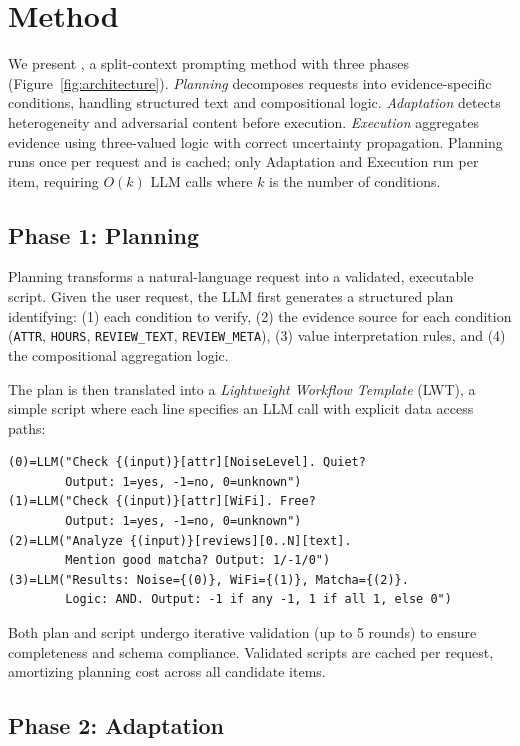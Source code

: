 \section{Method}



We present \method, a split-context prompting method with three phases (Figure~\ref{fig:architecture}).
\emph{Planning} decomposes requests into evidence-specific conditions, handling structured text and compositional logic.
\emph{Adaptation} detects heterogeneity and adversarial content before execution.
\emph{Execution} aggregates evidence using three-valued logic with correct uncertainty propagation.
Planning runs once per request and is cached; only Adaptation and Execution run per item, requiring $O(k)$ LLM calls where $k$ is the number of conditions.

\subsection{Phase 1: Planning}

Planning transforms a natural-language request into a validated, executable script.
Given the user request, the LLM first generates a structured plan identifying: (1) each condition to verify, (2) the evidence source for each condition (\texttt{ATTR}, \texttt{HOURS}, \texttt{REVIEW\_TEXT}, \texttt{REVIEW\_META}), (3) value interpretation rules, and (4) the compositional aggregation logic.

The plan is then translated into a \emph{Lightweight Workflow Template} (LWT), a simple script where each line specifies an LLM call with explicit data access paths:
\begin{verbatim}
(0)=LLM("Check {(input)}[attr][NoiseLevel]. Quiet?
        Output: 1=yes, -1=no, 0=unknown")
(1)=LLM("Check {(input)}[attr][WiFi]. Free?
        Output: 1=yes, -1=no, 0=unknown")
(2)=LLM("Analyze {(input)}[reviews][0..N][text].
        Mention good matcha? Output: 1/-1/0")
(3)=LLM("Results: Noise={(0)}, WiFi={(1)}, Matcha={(2)}.
        Logic: AND. Output: -1 if any -1, 1 if all 1, else 0")
\end{verbatim}




Both plan and script undergo iterative validation (up to 5 rounds) to ensure completeness and schema compliance.
Validated scripts are cached per request, amortizing planning cost across all candidate items.

\subsection{Phase 2: Adaptation}

